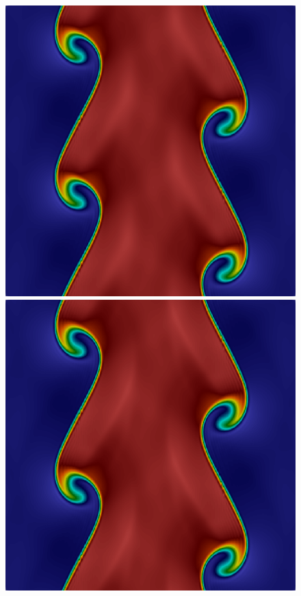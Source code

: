 \begin{figure}[h!]
\includegraphics[scale=0.115]{data/Compressible_Euler/KH/Snapshots/density_200_614.png}\hspace{1em}
\includegraphics[scale=0.115]{data/Compressible_Euler/KH/Snapshots/density_500_614.png}\hspace{1em}

\end{figure}
